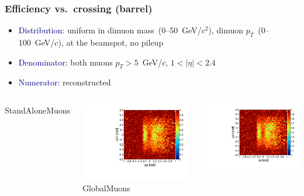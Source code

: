 \documentclass[compress]{beamer}
\begin{document}
\begin{frame}
\frametitle{Efficiency vs.\ crossing (barrel)}
\begin{itemize}
\item \textcolor{darkblue}{Distribution:} uniform in dimuon mass~(0--50~GeV/$c^2$), dimuon $p_T$~(0--100~GeV/$c$), at the beamspot, no pileup

\item \textcolor{darkblue}{Denominator:} both muons $p_T > 5$~GeV/$c$, $1 < |\eta| < 2.4$

\item \textcolor{darkblue}{Numerator:} reconstructed
\end{itemize}

\vfill
\begin{columns}
\centering StandAloneMuons

\includegraphics[width=\linewidth]{barrel_dphidr_StandAloneMuon.pdf}
\centering GlobalMuons

\includegraphics[width=\linewidth]{barrel_dphidr_GlobalMuon.pdf}


\end{columns}
\end{frame}
\end{document}
